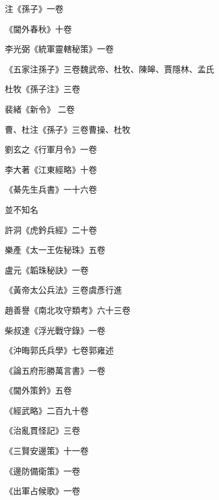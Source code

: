 \begin{pinyinscope}
 注《孫子》一卷



 《閫外春秋》十卷



 李光弼《統軍靈轄秘策》一卷



 《五家注孫子》三卷魏武帝、杜牧、陳皞、賈隱林、孟氏



 杜牧《孫子注》三卷



 裴緒《新令》
 二卷



 曹、杜注《孫子》三卷曹操、杜牧



 劉玄之《行軍月令》一卷



 李大著《江東經略》十卷



 《綦先生兵書》一十六卷



 並不知名



 許洞《虎鈐兵經》二十卷



 樂產《太一王佐秘珠》五卷



 盧元《韜珠秘訣》一卷



 《黃帝太公兵法》三卷虞彥行進



 趙善譽《南北攻守類考》六十三卷



 柴叔達《浮光戰守錄》一卷



 《沖晦郭氏兵學》七卷郭雍述



 《論五府形勝萬言書》一卷



 《閫外策鈐》五卷



 《經武略》二百九十卷



 《治亂貫怪記》三卷



 《三賢安邊策》十一卷



 《邊防備衛策》一卷



 《出軍占候歌》一卷




\end{pinyinscope}
